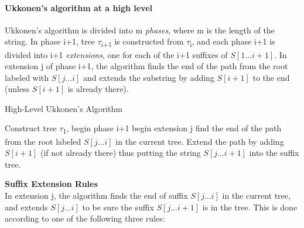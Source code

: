 \documentclass[11pt,a4paper]{article}
\begin{document}
\paragraph{Ukkonen's algorithm at a high level}
Ukkonen's algorithm is divided into m \emph{phases}, where m is the length of the string. In phase i+1, tree \begin{math}\tau\end{math}\textsubscript{i+1} is constructed from \begin{math}\tau\end{math}\textsubscript{i}, and each phase i+1 is divided into i+1 \emph{extensions}, one for each of the i+1 suffixes of \begin{math}S[1...i+1]\end{math}. In extension j of phase i+1, the algorithm finds the end of the path from the root labeled with \begin{math}S[j...i]\end{math} and extends the substring by adding \begin{math}S[i+1]\end{math} to the end (unless \begin{math}S[i+1]\end{math} is already there).
\begin{algorithm}[H]
\caption*{High-Level Ukkonen's Algorithm}
\label{ukknathighlevelpsuedocode}
\begin{algorithmic}
\STATE Construct tree \begin{math}\tau\end{math}\textsubscript{1},
\STATE begin {phase i+1}
\STATE begin {extension j}
\STATE find the end of the path from the root labeled \begin{math}S[j...i]\end{math} in the current tree. Extend the path by adding \begin{math}S[i+1]\end{math} (if not already there) thus putting the string \begin{math}S[j...i+1]\end{math} into the suffix tree.
\ENDFOR
\ENDFOR
\end{algorithmic}
\end{algorithm}
\textbf{Suffix Extension Rules}
\\
In extension j, the algorithm finds the end of suffix \begin{math}S[j...i]\end{math} in the current tree, and extends \begin{math}S[j...i]\end{math} to be sure the suffix \begin{math}S[j...i+1]\end{math} is in the tree. This is done according to one of the following three rules:
\end{document}
